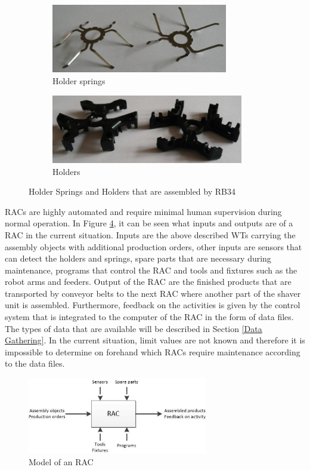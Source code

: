 \begin{figure}[ht]
\centering
\begin{subfigure}[b]{0.49\textwidth}
\includegraphics[width=\textwidth, height=3cm]{Figures/Afbeeldin1_Holder_springs}
\caption{Holder springs}
\label{fig:Holder springs}
\end{subfigure}
\begin{subfigure}[b]{0.49\textwidth}
\includegraphics[width=\textwidth, height=3cm]{Figures/Afbeelding2_Holders}
\caption{Holders}
\label{fig:Holders}
\end{subfigure}
\caption[Holder Springs and Holders that are assembled by RB34]{Holder Springs and Holders that are assembled by RB34}
\label{fig:Holders_Holder springs}
\end{figure}

RACs are highly automated and require minimal human supervision during normal operation. In Figure \ref{fig:RACmodel}, it can be seen what inputs and outputs are of a RAC \parencite{Mohamed2001} in the current situation. Inputs are the above described WTs carrying the assembly objects with additional production orders, other inputs are sensors that can detect the holders and springs, spare parts that are necessary during maintenance, programs that control the RAC and tools and fixtures such as the robot arms and feeders. Output of the RAC are the finished products that are transported by conveyor belts to the next RAC where another part of the shaver unit is assembled. Furthermore, feedback on the activities is given by the control system that is integrated to the computer of the RAC in the form of data files. The types of data that are available will be described in Section \ref{Data Gathering}. In the current situation, limit values are not known and therefore it is impossible to determine on forehand which RACs require maintenance according to the data files.
\begin{figure}[ht]
\centering
\includegraphics[width=0.7\textwidth]{Figures/RACmodel}
\caption[Model of an RAC]{Model of an RAC}
\label{fig:RACmodel}
\end{figure}

